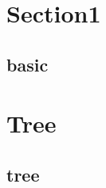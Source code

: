 \section{Section1}
    \subsection{basic}
        

\section{Tree}
    \subsection{tree}
        
        
